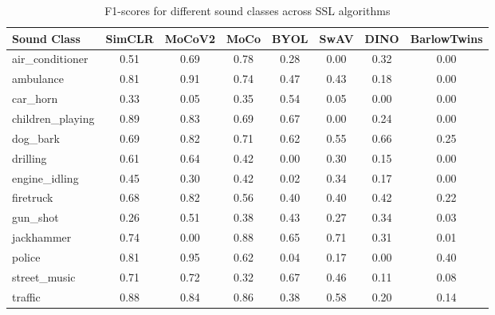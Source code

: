 \documentclass[11pt]{article}
\begin{document}
\begin{table}[ht]
    \centering
    \small
    \begin{tabular}{l|ccccccc}
    \hline
    \textbf{Sound Class} & \textbf{SimCLR} & \textbf{MoCoV2} & \textbf{MoCo} & \textbf{BYOL} & \textbf{SwAV} & \textbf{DINO} & \textbf{BarlowTwins} \\
    \hline
    air\_conditioner  & 0.51 & 0.69 & 0.78 & 0.28 & 0.00 & 0.32 & 0.00 \\
    ambulance        & 0.81 & 0.91 & 0.74 & 0.47 & 0.43 & 0.18 & 0.00 \\
    car\_horn         & 0.33 & 0.05 & 0.35 & 0.54 & 0.05 & 0.00 & 0.00 \\
    children\_playing & 0.89 & 0.83 & 0.69 & 0.67 & 0.00 & 0.24 & 0.00 \\
    dog\_bark         & 0.69 & 0.82 & 0.71 & 0.62 & 0.55 & 0.66 & 0.25 \\
    drilling         & 0.61 & 0.64 & 0.42 & 0.00 & 0.30 & 0.15 & 0.00 \\
    engine\_idling    & 0.45 & 0.30 & 0.42 & 0.02 & 0.34 & 0.17 & 0.00 \\
    firetruck        & 0.68 & 0.82 & 0.56 & 0.40 & 0.40 & 0.42 & 0.22 \\
    gun\_shot         & 0.26 & 0.51 & 0.38 & 0.43 & 0.27 & 0.34 & 0.03 \\
    jackhammer       & 0.74 & 0.00 & 0.88 & 0.65 & 0.71 & 0.31 & 0.01 \\
    police           & 0.81 & 0.95 & 0.62 & 0.04 & 0.17 & 0.00 & 0.40 \\
    street\_music     & 0.71 & 0.72 & 0.32 & 0.67 & 0.46 & 0.11 & 0.08 \\
    traffic          & 0.88 & 0.84 & 0.86 & 0.38 & 0.58 & 0.20 & 0.14 \\
    \hline
    \end{tabular}
    \caption{F1-scores for different sound classes across SSL algorithms}
\end{table}
\end{document}
